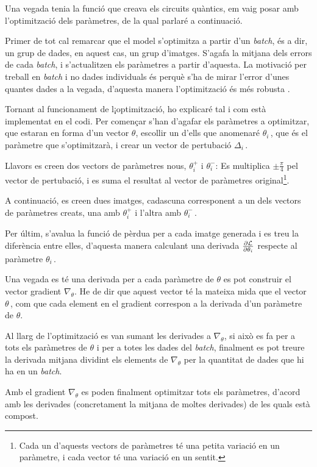 Una vegada tenia la funció que creava els circuits quàntics, em vaig posar amb l'optimització dels paràmetres, de la qual parlaré a continuació.

Primer de tot cal remarcar que el model s'optimitza a partir d'un \textit{batch}, és a dir, un grup de dades, en aquest cas, un grup d'imatges. S'agafa la mitjana dels errors de cada \textit{batch}, i s'actualitzen els paràmetres a partir d'aquesta. La motivació per treball en \textit{batch} i no dades individuals és perquè s'ha de mirar l'error d'unes quantes dades a la vegada, d'aquesta manera l'optimització és més robusta \cite{GAN2014}.

Tornant al funcionament de l¡optimització, ho explicaré tal i com està implementat en el codi. Per començar s'han d'agafar els paràmetres a optimitzar, que estaran en forma d'un vector $\theta$, escollir un d'ells que anomenaré $\theta_{i}\,$, que és el paràmetre que s'optimitzarà, i crear un vector de pertubació $\Delta_{i}\,$. 

Llavors es creen dos vectors de paràmetres nous, $\theta^{+}_{i}$ i $\theta^{-}_{i}$: Es multiplica $\pm\frac{\pi}{4}$ pel vector de pertubació, i es suma el resultat al vector de paràmetres original\footnote{Cada un d'aquests vectors de paràmetres té una petita variació en un paràmetre, i cada vector té una variació en un sentit.}. 

A continuació, es creen dues imatges, cadascuna corresponent a un dels vectors de paràmetres creats, una amb $\theta^{+}_{i}$ i l'altra amb $\theta^{-}_{i}\,$. 

Per últim, s'avalua la funció de pèrdua per a cada imatge generada i es treu la diferència entre elles, d'aquesta manera calculant una derivada $\pdv{\mathcal{L}}{\theta_i}$ respecte al paràmetre $\theta_{i}\,$.

Una vegada es té una derivada per a cada paràmetre de $\theta$ es pot construir el vector gradient $\nabla_\theta$. He de dir que aquest vector té la mateixa mida que el vector $\theta\,$, com que cada element en el gradient correspon a la derivada d'un paràmetre de $\theta$.

Al llarg de l'optimització es van sumant les derivades a $\nabla_\theta$, si això es fa per a tots els paràmetres de $\theta$ i per a totes les dades del \textit{batch}, finalment es pot treure la derivada mitjana dividint els elements de $\nabla_{\theta}$ per la quantitat de dades que hi ha en un \textit{batch}.

Amb el gradient $\nabla_{\theta}$ es poden finalment optimitzar tots els paràmetres, d'acord amb les derivades (concretament la mitjana de moltes derivades) de les quals està compost. 
 
